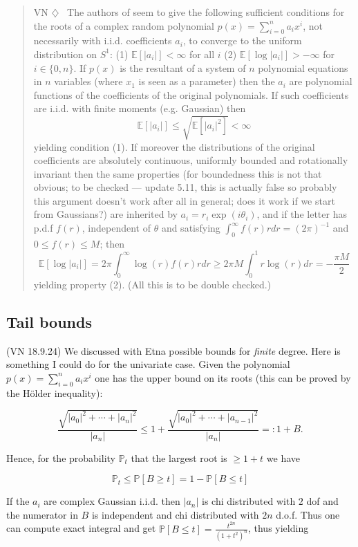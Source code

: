 \documentclass[12pt]{article}
\def\E{\mathbb{E}}
\def\P{\mathbb{P}}
\newenvironment{vn}{\begin{quote}\color{myviolet} \small\sf VN $\diamondsuit$~}{\end{quote}}
\begin{document}
\begin{vn}
    The authors of \cite{PY15} seem to give the following sufficient conditions for the roots of a complex random polynomial $p(x)=\sum_{i=0}^n a_i x^i$, not necessarily with i.i.d. coefficients $a_i$, to converge to the uniform distribution on $S^1$: (1) $\E[|a_i|] < \infty$ for all $i$ (2) $\E[\log|a_i|] > -\infty$ for $i\in \{0,n\}$. If $p(x)$ is the resultant of a system of $n$ polynomial equations in $n$ variables (where $x_1$ is seen as a parameter) then the $a_i$ are polynomial functions of the coefficients of the original polynomials. If such coefficients are i.i.d. with finite moments (e.g. Gaussian) then
    $$ \E[|a_i|] \leq \sqrt{\E[|a_i|^2]} < \infty  $$
    yielding condition (1). If moreover the distributions of the original coefficients are absolutely continuous, uniformly bounded and rotationally invariant then the same properties (for boundedness this is not that obvious; to be checked --- update 5.11, this is actually false so probably this argument doesn't work after all in general; does it work if we start from Gaussians?) are inherited by $a_i = r_i \exp(i \theta_i)$, and if the letter has p.d.f $f(r)$, independent of $\theta$ and satisfying $\int_0^\infty f(r) r dr = (2 \pi)^{-1}$ and $0 \leq f(r) \leq M$; then
    $$ \E[\log |a_i|] = 2 \pi \int_0^\infty \log(r) f(r) r dr \geq 2 \pi M \int_0^1 r \log(r) dr = -\frac{\pi M}{2}$$
    yielding property (2). (All this is to be double checked.)
\end{vn}


   
\subsection{Tail bounds}
(VN 18.9.24)
We discussed with Etna possible bounds for \emph{finite} degree. Here is something I could do for the univariate case. Given the polynomial $p(x)=\sum_{i=0}^n a_i x^i$ one has the upper bound on its roots (this can be proved by the H\"{o}lder inequality):

\[  \frac{\sqrt{|a_0|^2+\cdots+|a_n|^2}}{|a_n|} \leq 1 +  \frac{\sqrt{|a_0|^2+\cdots+|a_{n-1}|^2}}{|a_n|}=:1+B.\]

Hence, for the probability $\P_t$ that the largest root is $\geq 1+t$ we have

\[ \P_t \leq \P[B \geq t] = 1 - \P[B \leq t] \]

If the $a_i$ are complex Gaussian i.i.d. then $|a_n|$ is chi distributed with $2$ dof and the numerator in $B$ is independent and chi distributed with $2n$ d.o.f. Thus one can compute exact integral and get $\P[B \leq t]=\frac{t^{2n}}{(1+t^2)^n}$, thus yielding
\end{document}
